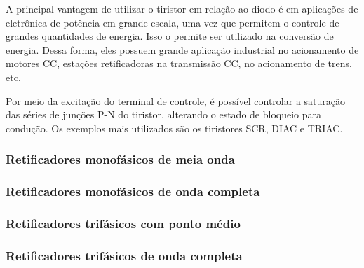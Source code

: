A principal vantagem de utilizar o tiristor em relação ao diodo é em aplicações de eletrônica de potência em grande escala, uma vez que permitem o controle de grandes quantidades de energia. Isso o permite ser utilizado na conversão de energia. Dessa forma, eles possuem grande aplicação industrial no acionamento de motores CC, estações retificadoras na transmissão CC, no acionamento de trens, etc. 

Por meio da excitação do terminal de controle, é possível controlar a saturação das séries de junções P-N do tiristor, alterando o estado de bloqueio para condução. Os exemplos mais utilizados são os tiristores SCR, DIAC e TRIAC.

\subsubsection{Retificadores monofásicos de meia onda}



\subsubsection{Retificadores monofásicos de onda completa}


 
\subsubsection*{Retificadores trifásicos com ponto médio}


 
\subsubsection*{Retificadores trifásicos de onda completa}



